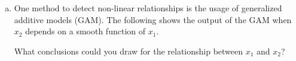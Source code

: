 {\begin{enumerate}[a)]
\begin{center}
\texttt{[image: figure/add\_Points\_x1\_x2.pdf]}
\end{center}

Based on your drawing, do you consider the Pearson correlation coefficient a reliable measure to 
detect dependencies for the above use case?

\item One method to detect non-linear relationships is the usage of 
generalized additive models (GAM).
The following shows the output of the GAM when $x_2$ depends on a smooth function of $x_1$. 

 

What conclusions could you draw for the relationship between $x_1$ and $x_2$? 

\end{enumerate}
}
